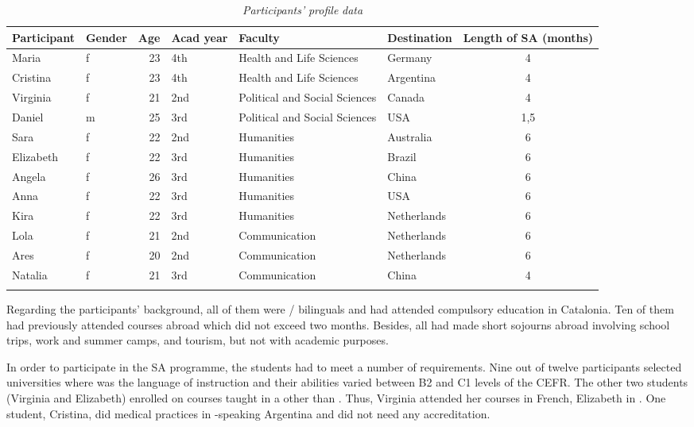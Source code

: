 \documentclass[output=paper]{langsci/langscibook}
\begin{document}
\begin{table}
\small
\begin{tabularx}{\textwidth}{l@{~}l@{~}rp{7mm}Ql@{~}S}
\lsptoprule
\bfseries Participant & \bfseries Gender & \bfseries Age & \bfseries Acad year & \bfseries Faculty & \bfseries Destination & \bfseries Length of SA (months)\\
\midrule
Maria & f & 23 & 4th & Health and Life Sciences & Germany & 4\\
Cristina & f & 23 & 4th & Health and Life Sciences & Argentina & 4\\
Virginia & f & 21 & 2nd & Political and Social Sciences & Canada & 4\\
Daniel & m & 25 & 3rd & Political and Social Sciences & USA & 1,5\\
Sara & f & 22 & 2nd & Humanities & Australia & 6\\
Elizabeth & f & 22 & 3rd & Humanities & Brazil & 6\\
Angela & f & 26 & 3rd & Humanities & China & 6\\
Anna & f & 22 & 3rd & Humanities & USA & 6\\
Kira & f & 22 & 3rd & Humanities & Netherlands & 6\\
Lola & f & 21 & 2nd & Communication & Netherlands & 6\\
Ares & f & 20 & 2nd & Communication & Netherlands & 6\\
Natalia & f & 21 & 3rd & Communication & China & 4\\
\lspbottomrule
\end{tabularx} 
\caption{\textit{Participants’} \textit{profile} \textit{data}}
\label{tab:pogorelova:1}
\end{table}

Regarding the participants’  background, all of them were /\linebreak{} bilinguals and had attended compulsory education in Catalonia. Ten of them had previously attended  courses abroad which did not exceed two months. Besides, all had made short sojourns abroad involving school trips, work and summer camps, and tourism, but not with academic purposes. 

In order to participate in the SA programme, the students had to meet a number of  requirements. Nine out of twelve participants selected universities where  was the language of instruction and their  abilities varied between B2 and C1 levels of the CEFR. The other two students (Virginia and Elizabeth) enrolled on courses taught in a  other than . Thus, Virginia attended her courses in French, Elizabeth in . One student, Cristina, did medical practices in -speaking Argentina and did not need any  accreditation.  
\end{document}
